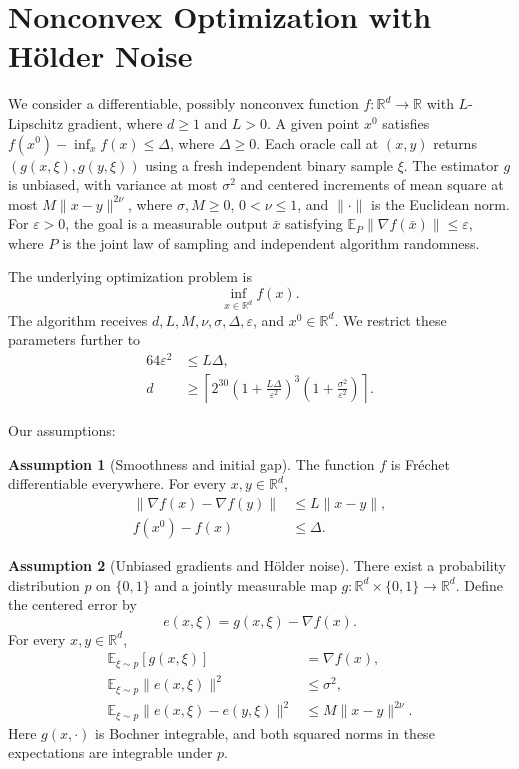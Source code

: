 \documentclass[10pt]{article}
\theoremstyle{definition}
\newtheorem{assumption}{Assumption}
\begin{document}
\section*{Nonconvex Optimization with H\"older Noise}
We consider a differentiable, possibly nonconvex function $f:\mathbb{R}^d\to\mathbb{R}$ with $L$-Lipschitz gradient, where $d\geq1$ and $L>0$. A given point $x^0$ satisfies $f(x^0)-\inf_x f(x)\leq\Delta$, where $\Delta\geq0$. Each oracle call at $(x,y)$ returns $(g(x,\xi),g(y,\xi))$ using a fresh independent binary sample $\xi$. The estimator $g$ is unbiased, with variance at most $\sigma^2$ and centered increments of mean square at most $M\|x-y\|^{2\nu}$, where $\sigma,M\geq0$, $0<\nu\leq1$, and $\|\cdot\|$ is the Euclidean norm. For $\varepsilon>0$, the goal is a measurable output $\bar{x}$ satisfying $\mathbb{E}_{P}\|\nabla f(\bar{x})\|\leq\varepsilon$, where $P$ is the joint law of sampling and independent algorithm randomness.

The underlying optimization problem is
\[
\inf_{x\in\mathbb{R}^d} f(x).
\]
The algorithm receives $d,L,M,\nu,\sigma,\Delta,\varepsilon$, and $x^0\in\mathbb{R}^d$. We restrict these parameters further to
\[
\begin{aligned}
64\varepsilon^2&\leq L\Delta,\\
d&\geq\left\lceil
2^{30}\left(1+\frac{L\Delta}{\varepsilon^2}\right)^3
\left(1+\frac{\sigma^2}{\varepsilon^2}\right)
\right\rceil.
\end{aligned}
\]

Our assumptions:
\begin{assumption}[Smoothness and initial gap]
The function $f$ is Fr\'echet differentiable everywhere. For every $x,y\in\mathbb{R}^d$,
\[
\begin{aligned}
\|\nabla f(x)-\nabla f(y)\|&\leq L\|x-y\|,\\
f(x^0)-f(x)&\leq\Delta.
\end{aligned}
\]
\end{assumption}

\begin{assumption}[Unbiased gradients and H\"older noise]
There exist a probability distribution $p$ on $\{0,1\}$ and a jointly measurable map $g:\mathbb{R}^d\times\{0,1\}\to\mathbb{R}^d$. Define the centered error by
\[
e(x,\xi)=g(x,\xi)-\nabla f(x).
\]
For every $x,y\in\mathbb{R}^d$,
\[
\begin{aligned}
\mathbb{E}_{\xi\sim p}[g(x,\xi)]&=\nabla f(x),\\
\mathbb{E}_{\xi\sim p}\|e(x,\xi)\|^2&\leq\sigma^2,\\
\mathbb{E}_{\xi\sim p}\|e(x,\xi)-e(y,\xi)\|^2
&\leq M\|x-y\|^{2\nu}.
\end{aligned}
\]
Here $g(x,\cdot)$ is Bochner integrable, and both squared norms in these expectations are integrable under $p$.
\end{assumption}
\end{document}
